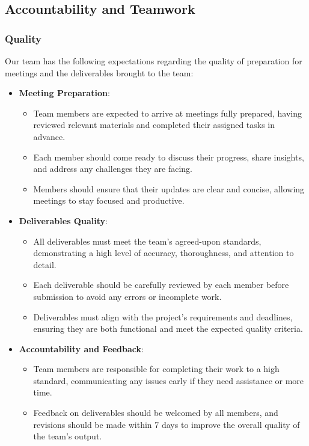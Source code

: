 \documentclass{article}
\begin{document}
\subsection*{Accountability and Teamwork}

\subsubsection*{\color{blue}Quality}

Our team has the following expectations regarding the quality of
preparation for meetings and the deliverables brought to the team:

\begin{itemize}
  \item \textbf{Meeting Preparation}:
    \begin{itemize}
      \item Team members are expected to arrive at meetings fully
        prepared, having reviewed relevant materials and completed
        their assigned tasks in advance.
      \item Each member should come ready to discuss their progress,
        share insights, and address any challenges they are facing.
      \item Members should ensure that their updates are clear and
        concise, allowing meetings to stay focused and productive.
    \end{itemize}

  \item \textbf{Deliverables Quality}:
    \begin{itemize}
      \item All deliverables must meet the team’s agreed-upon
        standards, demonstrating a high level of accuracy,
        thoroughness, and attention to detail.
      \item Each deliverable should be carefully reviewed by each
        member before submission to avoid any errors or incomplete work.
      \item Deliverables must align with the project's requirements
        and deadlines, ensuring they are both functional and meet the
        expected quality criteria.
    \end{itemize}

  \item \textbf{Accountability and Feedback}:
    \begin{itemize}
        \item Team members are responsible for completing their work to a high standard, communicating any issues early if they need assistance or more time.
        \item Feedback on deliverables should be welcomed by all members, and revisions should be made within 7 days to improve the overall quality of the team’s output.
    \end{itemize}

\end{itemize}
\end{document}
